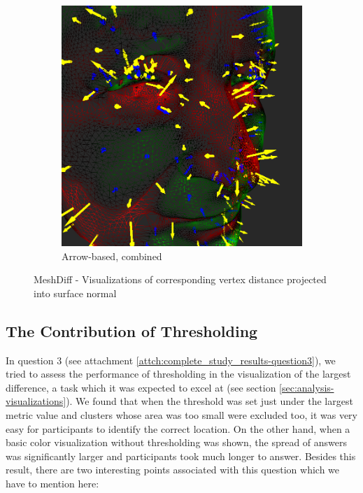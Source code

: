 \begin{figure}[h]
\begin{subfigure}{0.4\textwidth}
		\includegraphics[width=\textwidth]{./img/normal_projected_vis-arrows.PNG}
		\caption{Arrow-based, combined}
	\end{subfigure}
	\caption[MeshDiff - Absolute metric value visualizations]{MeshDiff - Visualizations of corresponding vertex distance projected into surface normal}
	\label{fig:meshdiff-normal_projected}
\end{figure}

\subsection{The Contribution of Thresholding}
\label{subsec:discussion-sig_results-thresholding_contrib}

In question 3 (see attachment \ref{attch:complete_study_results-question3}), we tried to assess the performance of thresholding in the visualization of the largest difference, a task which it was expected to excel at (see section \ref{sec:analysis-visualizations}). We found that when the threshold was set just under the largest metric value and clusters whose area was too small were excluded too\footnotemark, it was very easy for participants to identify the correct location. On the other hand, when a basic color visualization without thresholding was shown, the spread of answers was significantly larger and participants took much longer to answer. Besides this result, there are two interesting points associated with this question which we have to mention here:

